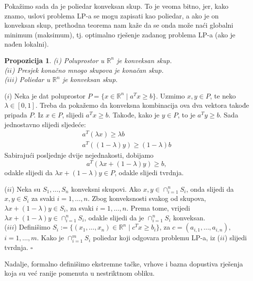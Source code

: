 \documentclass[a4paper, utf8, 11pt, colorlinks]{article}
\newtheorem{prop}{Propozicija}
\newenvironment{proof}{{Dokaz:}}{\hfill$\square$}
\begin{document}
Pokažimo sada da je poliedar konveksan skup. To je veoma bitno, jer, kako znamo, uslovi  problema LP-a se mogu zapisati kao poliedar, a ako je on konveksan skup, prethodna teorema nam kaže da se onda može naći globalni minimum (maksimum), tj. optimalno rješenje zadanog problema LP-a (ako je nađen lokalni).
\begin{prop}
  ($i$) Poluprostor u $\mathbb{R}^n$ je konveksan skup.  \\
  ($ii$) Presjek konačno mnogo skupova je konačan skup. \\
  ($iii$) Poliedar u $\mathbb{R}^n$ je konveksan skup. 
\end{prop}

\begin{proof}
  ($i$) Neka je dat poluprostor $P = \{ x \in \mathbb{R}^n \mid a^T x \geq b \}$. Uzmimo $x, y \in P$, te neko $\lambda \in [0, 1]$. Treba da pokažemo da konveksna kombinacija ova dva vektora takođe pripada $P$. Iz $x \in P$, slijedi  $a^T x \geq b$. Takođe, kako je $y \in P$, to je  $a^T y \geq b$. 
  Sada jednostavno slijedi sljedeće:
  \begin{align}
      a^T (\lambda x) \geq \lambda b \\
      a^T ((1-\lambda) y) \geq (1-\lambda) b 
  \end{align}
  Sabirajući posljednje dvije nejednakosti, dobijamo 
  \begin{equation}
      a^T( \lambda x + (1 - \lambda) y ) \geq b,
  \end{equation}
  odakle slijedi da $\lambda x + (1-\lambda) y \in P$, odakle slijedi tvrdnja. 
  
  ($ii$) Neka su $S_1,\ldots, S_n$ konveksni skupovi. Ako $x,y \in \cap_{i=1}^n S_i$, onda slijedi da $x,y \in S_i$ za svaki $i=1,\ldots,n$. Zbog konveksnosti svakog od skupova,  
  $\lambda x + (1 - \lambda) y \in S_i$, za svaki $i=1,\ldots,n$. Prema tome, vrijedi $ \lambda x + (1-\lambda) y \in \cap_{i=1}^n S_i$, odakle slijedi da je $\cap_{i=1}^n S_i$ konveksan. \\
  
  ($iii$) Definišimo $S_i:= \{ (x_1,\ldots, x_n) \in \mathbb{R}^n \mid c^T x \geq b_i \}$, za  $c = (a_{i,1}, \ldots, a_{i, n}),$  $ i=1,\ldots, m$. Kako je $\cap_{i=1}^m S_i$ poliedar koji odgovara problemu LP-a, iz ($ii$) slijedi tvrdnja. 
\end{proof}

Nadalje, formalno definišimo ekstremne tačke, vrhove i bazna dopustiva rješenja koja su već ranije pomenuta u nestriktnom obliku. 
\end{document}
